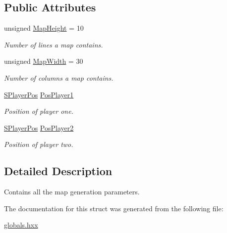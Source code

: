 \subsection*{Public Attributes}
\begin{DoxyCompactItemize}
\item 
\hypertarget{struct_chase_game_1_1_s_map_gen_params_a772c51dab66176dfe733e4e20cbf85d4}{unsigned \hyperlink{struct_chase_game_1_1_s_map_gen_params_a772c51dab66176dfe733e4e20cbf85d4}{Map\-Height} = 10}\label{struct_chase_game_1_1_s_map_gen_params_a772c51dab66176dfe733e4e20cbf85d4}

\begin{DoxyCompactList}\small\item\em Number of lines a map contains. \end{DoxyCompactList}\item 
\hypertarget{struct_chase_game_1_1_s_map_gen_params_a0897aeaa1a1a3a66697a6b441ca8c2de}{unsigned \hyperlink{struct_chase_game_1_1_s_map_gen_params_a0897aeaa1a1a3a66697a6b441ca8c2de}{Map\-Width} = 30}\label{struct_chase_game_1_1_s_map_gen_params_a0897aeaa1a1a3a66697a6b441ca8c2de}

\begin{DoxyCompactList}\small\item\em Number of columns a map contains. \end{DoxyCompactList}\item 
\hypertarget{struct_chase_game_1_1_s_map_gen_params_a8db28a9ee45a200d67b20fc803645501}{\hyperlink{struct_chase_game_1_1_s_player_pos}{S\-Player\-Pos} \hyperlink{struct_chase_game_1_1_s_map_gen_params_a8db28a9ee45a200d67b20fc803645501}{Pos\-Player1}}\label{struct_chase_game_1_1_s_map_gen_params_a8db28a9ee45a200d67b20fc803645501}

\begin{DoxyCompactList}\small\item\em Position of player one. \end{DoxyCompactList}\item 
\hypertarget{struct_chase_game_1_1_s_map_gen_params_afd0a0d4b22e228d547af88d38b6ae963}{\hyperlink{struct_chase_game_1_1_s_player_pos}{S\-Player\-Pos} \hyperlink{struct_chase_game_1_1_s_map_gen_params_afd0a0d4b22e228d547af88d38b6ae963}{Pos\-Player2}}\label{struct_chase_game_1_1_s_map_gen_params_afd0a0d4b22e228d547af88d38b6ae963}

\begin{DoxyCompactList}\small\item\em Position of player two. \end{DoxyCompactList}\end{DoxyCompactItemize}


\subsection{Detailed Description}
Contains all the map generation parameters. 

The documentation for this struct was generated from the following file\-:\begin{DoxyCompactItemize}
\item 
\hyperlink{globals_8hxx}{globals.\-hxx}\end{DoxyCompactItemize}
